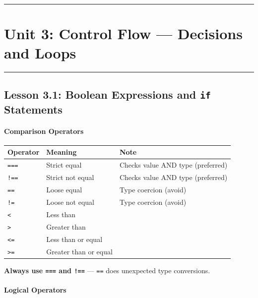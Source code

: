 \documentclass[
  justified,
  openright,
]{tufte-book}
\let\subsubsection\paragraph
\let\paragraph\paragraph
\let\subsubsection\paragraph
\let\paragraph\paragraph
\begin{document}
\begin{center}\rule{0.5\linewidth}{0.5pt}\end{center}

\section{Unit 3: Control Flow --- Decisions and
Loops}\label{unit-3-control-flow-decisions-and-loops}

\begin{center}\rule{0.5\linewidth}{0.5pt}\end{center}

\subsection{\texorpdfstring{Lesson 3.1: Boolean Expressions and
\texttt{if}
Statements}{Lesson 3.1: Boolean Expressions and if Statements}}\label{lesson-3.1-boolean-expressions-and-if-statements}

\subsubsection{Comparison Operators}\label{comparison-operators}

{\def\LTcaptype{none} %
\begin{longtable}[]{@{}lll@{}}
\toprule\noalign{}
Operator & Meaning & Note \\
\midrule\noalign{}
\endhead
\bottomrule\noalign{}
\endlastfoot
\texttt{===} & Strict equal & Checks value AND type (preferred) \\
\texttt{!==} & Strict not equal & Checks value AND type (preferred) \\
\texttt{==} & Loose equal & Type coercion (avoid) \\
\texttt{!=} & Loose not equal & Type coercion (avoid) \\
\texttt{\textless{}} & Less than & \\
\texttt{\textgreater{}} & Greater than & \\
\texttt{\textless{}=} & Less than or equal & \\
\texttt{\textgreater{}=} & Greater than or equal & \\
\end{longtable}
}

\textbf{Always use \texttt{===} and \texttt{!==}} --- \texttt{==} does
unexpected type conversions.

\subsubsection{Logical Operators}\label{logical-operators}
\end{document}
